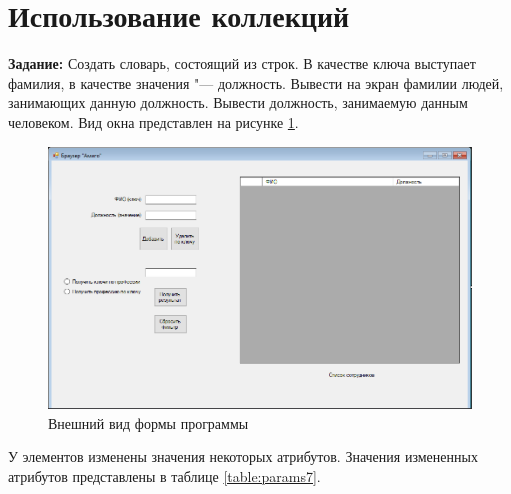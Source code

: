 \section{Использование коллекций}

\textbf{Задание:} Создать словарь, состоящий из строк. В качестве ключа выступает фамилия, в качестве значения "--- должность. Вывести на экран фамилии людей, занимающих данную должность. 
Вывести должность, занимаемую данным человеком.
Вид окна представлен на рисунке \ref{fig:task7_form}.
\begin{figure}[H]
    \centering
    \includegraphics[scale=0.7]{task7/form.png}
    \caption{Внешний вид формы программы}
    \label{fig:task7_form}
\end{figure}
У элементов изменены значения некоторых атрибутов. 
Значения измененных атрибутов представлены в таблице \ref{table:params7}.
